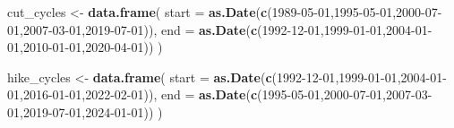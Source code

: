 \documentclass[
]{article}
\newenvironment{Shaded}{\begin{snugshade}}{\end{snugshade}}
\newcommand{\AttributeTok}[1]{\textcolor[rgb]{0.13,0.29,0.53}{#1}}
\newcommand{\FunctionTok}[1]{\textcolor[rgb]{0.13,0.29,0.53}{\textbf{#1}}}
\newcommand{\NormalTok}[1]{#1}
\newcommand{\OtherTok}[1]{\textcolor[rgb]{0.56,0.35,0.01}{#1}}
\newcommand{\StringTok}[1]{\textcolor[rgb]{0.31,0.60,0.02}{#1}}
\begin{document}
\begin{Shaded}
\begin{Highlighting}[]
\NormalTok{cut\_cycles }\OtherTok{\textless{}{-}} \FunctionTok{data.frame}\NormalTok{(}
  \AttributeTok{start =} \FunctionTok{as.Date}\NormalTok{(}\FunctionTok{c}\NormalTok{(}\StringTok{\textquotesingle{}1989{-}05{-}01\textquotesingle{}}\NormalTok{,}\StringTok{\textquotesingle{}1995{-}05{-}01\textquotesingle{}}\NormalTok{,}\StringTok{\textquotesingle{}2000{-}07{-}01\textquotesingle{}}\NormalTok{,}\StringTok{\textquotesingle{}2007{-}03{-}01\textquotesingle{}}\NormalTok{,}\StringTok{\textquotesingle{}2019{-}07{-}01\textquotesingle{}}\NormalTok{)),}
  \AttributeTok{end =} \FunctionTok{as.Date}\NormalTok{(}\FunctionTok{c}\NormalTok{(}\StringTok{\textquotesingle{}1992{-}12{-}01\textquotesingle{}}\NormalTok{,}\StringTok{\textquotesingle{}1999{-}01{-}01\textquotesingle{}}\NormalTok{,}\StringTok{\textquotesingle{}2004{-}01{-}01\textquotesingle{}}\NormalTok{,}\StringTok{\textquotesingle{}2010{-}01{-}01\textquotesingle{}}\NormalTok{,}\StringTok{\textquotesingle{}2020{-}04{-}01\textquotesingle{}}\NormalTok{))}
\NormalTok{)}

\NormalTok{hike\_cycles }\OtherTok{\textless{}{-}} \FunctionTok{data.frame}\NormalTok{(}
  \AttributeTok{start =} \FunctionTok{as.Date}\NormalTok{(}\FunctionTok{c}\NormalTok{(}\StringTok{\textquotesingle{}1992{-}12{-}01\textquotesingle{}}\NormalTok{,}\StringTok{\textquotesingle{}1999{-}01{-}01\textquotesingle{}}\NormalTok{,}\StringTok{\textquotesingle{}2004{-}01{-}01\textquotesingle{}}\NormalTok{,}\StringTok{\textquotesingle{}2016{-}01{-}01\textquotesingle{}}\NormalTok{,}\StringTok{\textquotesingle{}2022{-}02{-}01\textquotesingle{}}\NormalTok{)),}
  \AttributeTok{end =} \FunctionTok{as.Date}\NormalTok{(}\FunctionTok{c}\NormalTok{(}\StringTok{\textquotesingle{}1995{-}05{-}01\textquotesingle{}}\NormalTok{,}\StringTok{\textquotesingle{}2000{-}07{-}01\textquotesingle{}}\NormalTok{,}\StringTok{\textquotesingle{}2007{-}03{-}01\textquotesingle{}}\NormalTok{,}\StringTok{\textquotesingle{}2019{-}07{-}01\textquotesingle{}}\NormalTok{,}\StringTok{\textquotesingle{}2024{-}01{-}01\textquotesingle{}}\NormalTok{))}
\NormalTok{)}


\end{Highlighting}
\end{Shaded}
\end{document}
